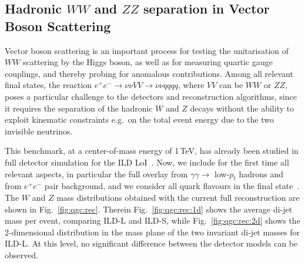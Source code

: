 \subsection{Hadronic \texorpdfstring{$WW$ and $ZZ$}{WW and ZZ} separation in Vector Boson Scattering} 

Vector boson scattering is an important process for testing the unitarisation of $WW$ scattering by the Higgs boson, as well as for measuring quartic gauge couplings, and thereby probing for anomalous contributions. Among all relevant final states, the reaction $e^+e^- \to \nu\nu VV \to \nu\nu qqqq$, where $VV$ can be $WW$ or $ZZ$, poses a particular challenge to the detectors and reconstruction algorithms, since it requires the separation of the hadronic $W$ and $Z$ decays without the ability to exploit kinematic constraints e.g.\ on the
total event energy due to the two invisible neutrinos.

This benchmark, at a center-of-mass energy of 1\,TeV, has already been studied in full detector simulation for the ILD LoI~\cite{ild:bib:ILDloi}. Now, we include for the first time all relevant aspects, in particular the full overlay from $\gamma\gamma \to$ low-$p_t$ hadrons and from $e^+e^-$ pair background, and we consider all quark flavours in the final state~\cite{ILDNote:QGCs}. The $W$ and $Z$ mass distributions obtained with the current full reconstruction are shown in Fig.~\ref{fig:qgc:rec}. Therein Fig.~\ref{fig:qgc:rec:1d} shows the average di-jet mass per event, comparing ILD-L and ILD-S, while Fig.~\ref{fig:qgc:rec:2d} shows the 2-dimensional distribution in the mass plane of the two invariant di-jet masses for ILD-L. At this level, no significant difference between the detector models can be observed.


